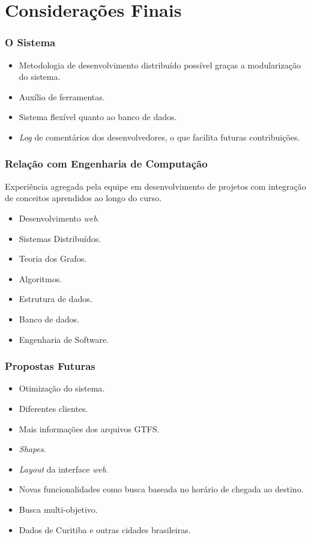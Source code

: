 \section{Considerações Finais}

\frame
{
\frametitle{O Sistema}
\begin{itemize}
	\item Metodologia de desenvolvimento distribuído possível graças a modularização do sistema.
	\item Auxílio de ferramentas.
	\item Sistema flexível quanto ao banco de dados.
	\item \emph{Log} de comentários dos desenvolvedores, o que facilita futuras contribuições.
\end{itemize}
}

\frame
{
\frametitle{Relação com Engenharia de Computação}
Experiência agregada pela equipe em desenvolvimento de projetos com integração de conceitos aprendidos ao longo do curso.
\begin{itemize}
\item Desenvolvimento \emph{web}.
\item Sistemas Distribuídos.
\item Teoria dos Grafos.
\item Algoritmos.
\item Estrutura de dados.
\item Banco de dados.
\item Engenharia de Software.
\end{itemize}
}

\frame
{
\frametitle{Propostas Futuras}
\begin{itemize}
\item Otimização do sistema.
\item Diferentes clientes.
\item Mais informações dos arquivos GTFS.
\item \emph{Shapes}.
\item \emph{Layout} da interface \emph{web}.
\item Novas funcionalidades como busca baseada no horário de chegada ao destino.
\item Busca multi-objetivo.
\item Dados de Curitiba e outras cidades brasileiras.
\end{itemize}
}
